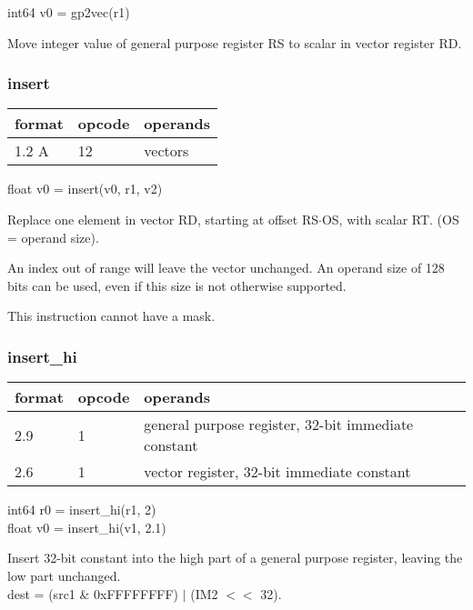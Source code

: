 \documentclass[forwardcom.tex]{subfiles}
\begin{document}
int64 v0 = gp2vec(r1)
\vspace{2mm}

Move integer value of general purpose register RS to
scalar in vector register RD.
\vspace{2mm}


\subsubsection{insert}
\label{table:insertInstruction}
\begin{tabular}{|p{12mm}|p{12mm}|p{110mm}|}
\hline
\bfseries format & \bfseries opcode & \bfseries operands \\ \hline
1.2 A & 12 & vectors \\ \hline
\end{tabular}
\vspace{2mm}

float v0 = insert(v0, r1, v2)
\vspace{2mm}

Replace one element in vector RD, starting at
offset RS$\cdot$OS, with scalar RT. (OS = operand size).
\vspace{2mm}

An index out of range will leave the vector unchanged. An operand size of 128 bits can be used, even if this size is not otherwise supported.
\vspace{2mm}

This instruction cannot have a mask.


\subsubsection{insert\_hi}
\label{table:insertHiInstruction}
\begin{tabular}{|p{12mm}|p{12mm}|p{110mm}|}
\hline
\bfseries format & \bfseries opcode & \bfseries operands \\ \hline
2.9 & 1 & general purpose register, 32-bit immediate constant \\ \hline
2.6 & 1 & vector register, 32-bit immediate constant \\ \hline
\end{tabular}
\vspace{2mm}

int64 r0 = insert\_hi(r1, 2) \\
float v0 = insert\_hi(v1, 2.1)
\vspace{2mm}

Insert 32-bit constant into the high part of a
general purpose register, leaving the low part
unchanged. \\
dest = (src1 \& 0xFFFFFFFF) $|$ (IM2 $<<$ 32).
\vspace{2mm}
\end{document}
